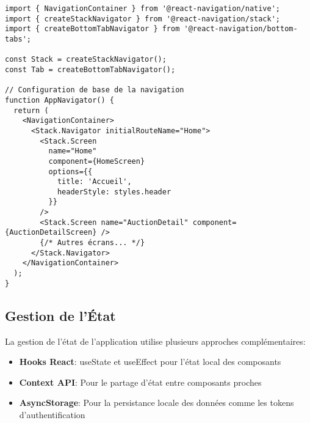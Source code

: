 \begin{verbatim}
import { NavigationContainer } from '@react-navigation/native';
import { createStackNavigator } from '@react-navigation/stack';
import { createBottomTabNavigator } from '@react-navigation/bottom-tabs';

const Stack = createStackNavigator();
const Tab = createBottomTabNavigator();

// Configuration de base de la navigation
function AppNavigator() {
  return (
    <NavigationContainer>
      <Stack.Navigator initialRouteName="Home">
        <Stack.Screen
          name="Home"
          component={HomeScreen}
          options={{ 
            title: 'Accueil',
            headerStyle: styles.header
          }}
        />
        <Stack.Screen name="AuctionDetail" component={AuctionDetailScreen} />
        {/* Autres écrans... */}
      </Stack.Navigator>
    </NavigationContainer>
  );
}
\end{verbatim}

\subsection{Gestion de l'État}

La gestion de l'état de l'application utilise plusieurs approches complémentaires:

\begin{itemize}
    \item \textbf{Hooks React}: useState et useEffect pour l'état local des composants
    \item \textbf{Context API}: Pour le partage d'état entre composants proches
    \item \textbf{AsyncStorage}: Pour la persistance locale des données comme les tokens d'authentification
\end{itemize}

